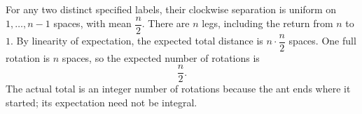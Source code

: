 For any two distinct specified labels, their clockwise separation is uniform on $1,\ldots,n-1$ spaces, with mean $\dfrac{n}{2}$. There are $n$ legs, including the return from $n$ to $1$. By linearity of expectation, the expected total distance is $n\cdot\dfrac{n}{2}$ spaces. One full rotation is $n$ spaces, so the expected number of rotations is
\[
\boxed{\dfrac{n}{2}}.
\]
The actual total is an integer number of rotations because the ant ends where it started; its expectation need not be integral.
